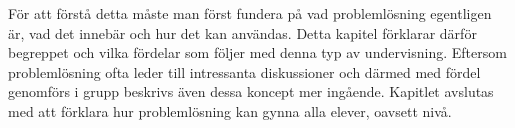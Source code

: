 \textcolor{lila}{För att förstå detta måste man först fundera på vad problemlösning egentligen är, vad det innebär och hur det kan användas. Detta kapitel förklarar därför begreppet och vilka fördelar som följer med denna typ av undervisning. Eftersom problemlösning ofta leder till intressanta diskussioner och därmed med fördel genomförs i grupp beskrivs även dessa koncept mer ingående. Kapitlet avslutas med att förklara hur problemlösning kan gynna alla elever, oavsett nivå.}